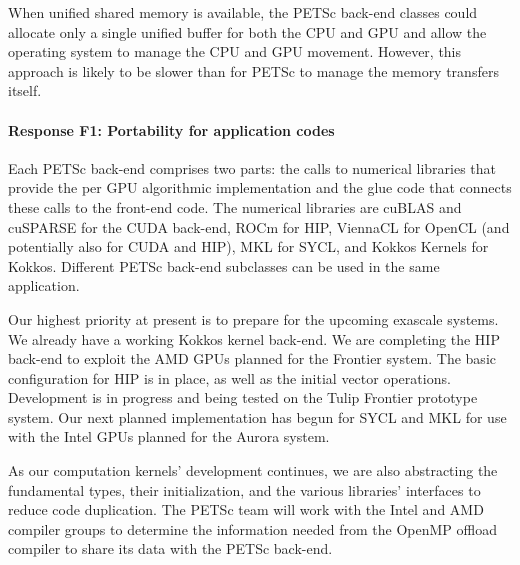 \documentclass[10pt,journal,compsoc]{IEEEtran}
\begin{document}
When unified shared memory is available,
the PETSc back-end classes could allocate only a single unified buffer for
both the CPU and GPU and allow the operating system to manage the CPU and GPU movement. However, this approach is likely to be slower than for PETSc to manage
the memory transfers itself.


\paragraph{Response F1: Portability for application codes} 
Each PETSc back-end comprises two parts: the calls to numerical libraries that
provide the per GPU algorithmic implementation and the glue code that connects
these calls to the front-end code. The numerical libraries are cuBLAS and
cuSPARSE for the CUDA back-end, ROCm for HIP,
ViennaCL \cite{VIENNACL} for OpenCL (and potentially also for CUDA and
HIP), MKL for SYCL, and Kokkos Kernels for 
Kokkos. Different PETSc back-end subclasses
can be used in the same application. 
    
Our highest priority at present is to prepare for the upcoming exascale systems.
We already have a working Kokkos kernel back-end. We
are completing the HIP back-end to exploit the AMD GPUs
planned for the Frontier system.   
The basic configuration for HIP is in place, as well as the initial vector
operations. Development is in progress and being tested on the Tulip Frontier prototype
system. Our next planned implementation has begun for SYCL and MKL for use with the Intel GPUs planned for the Aurora system.  

As our computation kernels' development  continues, we are also
abstracting the fundamental types, their initialization, and the various libraries' interfaces to reduce code duplication.
The PETSc team will work with the Intel and AMD compiler groups to determine the information needed from the OpenMP offload compiler to share its data with the PETSc back-end.

\end{document}
